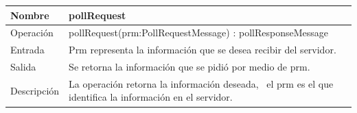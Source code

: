 \documentclass[11pt]{article}
\begin{document}
\bigskip

\begin{flushleft}
\tablefirsthead{}
\tablehead{}
\tabletail{}
\tablelasttail{}
\begin{supertabular}{|m{1.0115598in}|m{4.7441597in}|}
\hline
Nombre &
pollRequest\\\hline
Operación &
pollRequest(prm:PollRequestMessage) : pollResponseMessage\\\hline
Entrada &
Prm representa la información que se desea recibir del servidor.\\\hline
Salida &
Se retorna la información que se pidió por medio de prm.\\\hline
Descripción &
La operación retorna la información deseada, \ el prm es el que identifica la información en el servidor.\\\hline
\end{supertabular}
\end{flushleft}

\bigskip
\end{document}
